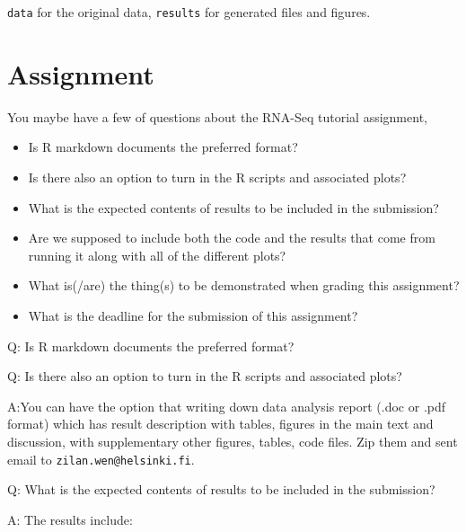 \documentclass[
]{article}
\begin{document}
\texttt{data} for the original data, \texttt{results} for generated
files and figures.

\section{Assignment}\label{assignment}

You maybe have a few of questions about the RNA-Seq tutorial assignment,

\begin{itemize}
\item
  Is R markdown documents the preferred format?
\item
  Is there also an option to turn in the R scripts and associated plots?
\item
  What is the expected contents of results to be included in the
  submission?
\item
  Are we supposed to include both the code and the results that come
  from running it along with all of the different plots?
\item
  What is(/are) the thing(s) to be demonstrated when grading this
  assignment?
\item
  What is the deadline for the submission of this assignment?
\end{itemize}

Q: Is R markdown documents the preferred format?

Q: Is there also an option to turn in the R scripts and associated
plots?

A:You can have the option that writing down data analysis report (.doc
or .pdf format) which has result description with tables, figures in the
main text and discussion, with supplementary other figures, tables, code
files. Zip them and sent email to \texttt{zilan.wen@helsinki.fi}.

Q: What is the expected contents of results to be included in the
submission?

A: The results include:\\
\end{document}
